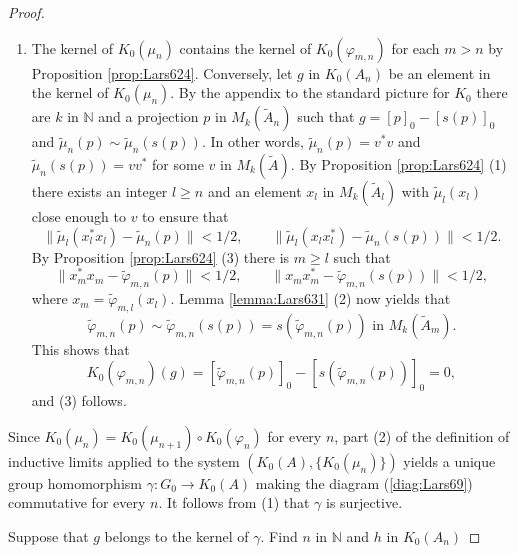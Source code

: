 \documentclass{book}
\begin{document}
\begin{proof}
\begin{enumerate}
      \(K_0(\mu_n)\) is positive. Conversely, let \(g\) in \(K_0(A)^+\) be given. Then \(g={[p]}_0\) for some 
      natural number \(k\) and some projection \(p\) in \(M_k(A)\). Arguing as in (1) we find a natural number
      \(m\) and a projection \(q\) in \(M_k(A_m)\) such that \(\|\mu_m(q)-p\|<1\).
      It follows that \(p\sim \mu_m(q)\), and hence that \(g={[\mu_m(q)]}_0=K_0(\mu_m)({[q]}_0)\);
      this proves (2) because \({[q]}_0\) belongs to \(K_0(A_m)^+\).
    \item The kernel of \(K_0(\mu_n)\) contains the kernel of \(K_0(\varphi_{m,n})\) for each \(m>n\)
      by Proposition \ref{prop:Lars624}. Conversely, let \(g\) in \(K_0(A_n)\) be an element in the kernel
      of \(K_0(\mu_n)\). By the appendix to the standard picture for \(K_0\)
      there are \(k\) in \(\mathbb{N}\) and a projection \(p\) in \(M_k(\tilde{A}_n)\) such that \(g={[p]}_0-{[s(p)]}_0\)
      and \(\tilde{\mu}_n(p)\sim\tilde{\mu}_n(s(p))\). In other words, \(\tilde{\mu}_n(p)=v^*v\) and \(\tilde{\mu}_n(s(p))=vv^*\)
      for some \(v\) in \(M_k(\tilde{A})\). By Proposition \ref{prop:Lars624} (1) there exists an integer \(l\geq n\) and an element
      \(x_l\) in \(M_k(\tilde{A}_l)\) with \(\tilde{\mu}_l(x_l)\) close enough to \(v\) to ensure that
      \[
        \|\tilde{\mu}_l(x^*_lx_l)-\tilde{\mu}_n(p)\|<1/2,\qquad\|\tilde{\mu}_l(x_lx^*_l)-\tilde{\mu}_n(s(p))\|<1/2.
      \]
      By Proposition \ref{prop:Lars624} (3) there is \(m\geq l\) such that
      \[
        \|x_m^*x_m-\tilde{\varphi}_{m,n}(p)\|<1/2,\qquad\|x_mx_m^*-\tilde{\varphi}_{m,n}(s(p))\|<1/2,
      \]
      where \(x_m=\tilde{\varphi}_{m,l}(x_l)\). Lemma \ref{lemma:Lars631} (2) now yields that
      \[
        \tilde{\varphi}_{m,n}(p)\sim\tilde{\varphi}_{m,n}(s(p))=s(\tilde{\varphi}_{m,n}(p))\text{ in }M_k(\tilde{A}_m).
      \]
      This shows that
      \[
        K_0(\varphi_{m,n})(g)={[\tilde{\varphi}_{m,n}(p)]}_0-{[s(\tilde{\varphi}_{m,n}(p))]}_0=0,
      \]
      and (3) follows.
  \end{enumerate}\par
  Since \(K_0(\mu_n)=K_0(\mu_{n+1})\circ K_0(\varphi_n)\) for every \(n\), part (2) of the definition of inductive limits
  applied to the system \((K_0(A),\{K_0(\mu_n)\})\) yields a unique group homomorphism \(\gamma:G_0\to K_0(A)\) making the diagram
  (\ref{diag:Lars69}) commutative for every \(n\). It follows from (1) that \(\gamma\) is surjective.\par
  Suppose that \(g\) belongs to the kernel of \(\gamma\). Find \(n\) in \(\mathbb{N}\) and \(h\) in \(K_0(A_n)\)

\end{proof}
\end{document}
